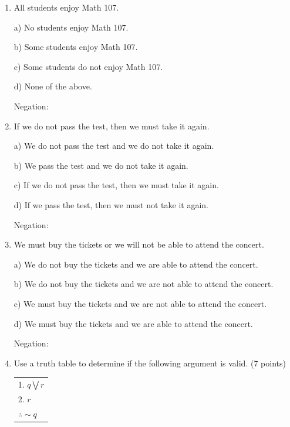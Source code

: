 \documentclass[12pt]{article}
\newcommand{\tab}{\hspace*{2em}}
\begin{document}
\begin{enumerate}
\tab d) None of the above.

Negation: \underline{\hspace{1.0 in}}

\newpage
\item All students enjoy Math 107.

\tab a) No students enjoy Math 107.

\tab b) Some students enjoy Math 107.

\tab c) Some students do not enjoy Math 107.

\tab d) None of the above.

Negation: \underline{\hspace{1.0 in}}


\item If we do not pass the test, then we must take it again.

\tab a) We do not pass the test and we do not take it again.

\tab b) We pass the test and we do not take it again.

\tab c) If we do not pass the test, then we must take it again.

\tab d) If we pass the test, then we must not take it again.

Negation: \underline{\hspace{1.0 in}}

\item We must buy the tickets or we will not be able to attend the concert.

\tab a) We do not buy the tickets and we are able to attend the concert.

\tab b) We do not buy the tickets and we are not able to attend the concert.

\tab c) We must buy the tickets and we are not able to attend the concert.

\tab d) We must buy the tickets and we are able to attend the concert.

Negation: \underline{\hspace{1.0 in}}


\item
Use a truth table to determine if the following argument is valid. (7 points)
\begin{center}
\begin{tabular}{l}
1. $q\bigvee r$\\
2. $r$\\
\hline
$\therefore \sim q$
\end{tabular}
\end{center}


\end{enumerate}
\end{document}
